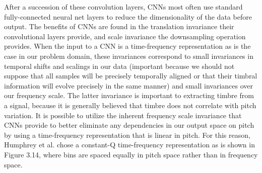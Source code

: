 \documentclass[12pt]{report} 	%
\numberwithin{figure}{chapter}
\numberwithin{table}{chapter}
\numberwithin{equation}{chapter}
\begin{document}
\begin{flushleft}
\begin{figure}[h!]
\begin{center}
\end{center}
\end{figure}
After a succession of these convolution layers, CNNs most often use standard fully-connected neural net layers to reduce the dimensionality of the data before output. The benefits of CNNs are found in the translation invariance their convolutional layers provide, and scale invariance the downsampling operation provides. When the input to a CNN is a time-frequency representation as is the case in our problem domain, these invariances correspond to small invariances in temporal shifts and scalings in our data (important because we should not suppose that all samples will be precisely temporally aligned or that their timbral information will evolve precisely in the same manner) and small invariances over our frequency scale. The latter invariance is important to extracting timbre from a signal, because it is generally believed that timbre does not correlate with pitch variation. It is possible to utilize the inherent frequency scale invariance that CNNs provide to better eliminate any dependencies in our output space on pitch by using a time-frequency representation that is linear in pitch. For this reason, Humphrey et al. chose a constant-Q time-frequency representation as is shown in Figure 3.14, where bins are spaced equally in pitch space rather than in frequency space.


\end{flushleft}
\end{document}
